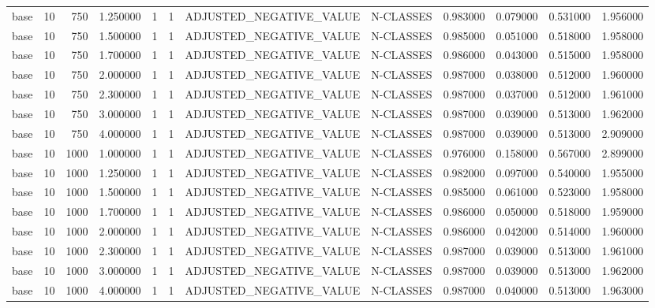 \begin{tabular}{lrrrllllrrrr}
base & 10 & 750 & 1.250000 & 1 & 1 & ADJUSTED_NEGATIVE_VALUE & N-CLASSES & 0.983000 & 0.079000 & 0.531000 & 1.956000 \\
base & 10 & 750 & 1.500000 & 1 & 1 & ADJUSTED_NEGATIVE_VALUE & N-CLASSES & 0.985000 & 0.051000 & 0.518000 & 1.958000 \\
base & 10 & 750 & 1.700000 & 1 & 1 & ADJUSTED_NEGATIVE_VALUE & N-CLASSES & 0.986000 & 0.043000 & 0.515000 & 1.958000 \\
base & 10 & 750 & 2.000000 & 1 & 1 & ADJUSTED_NEGATIVE_VALUE & N-CLASSES & 0.987000 & 0.038000 & 0.512000 & 1.960000 \\
base & 10 & 750 & 2.300000 & 1 & 1 & ADJUSTED_NEGATIVE_VALUE & N-CLASSES & 0.987000 & 0.037000 & 0.512000 & 1.961000 \\
base & 10 & 750 & 3.000000 & 1 & 1 & ADJUSTED_NEGATIVE_VALUE & N-CLASSES & 0.987000 & 0.039000 & 0.513000 & 1.962000 \\
base & 10 & 750 & 4.000000 & 1 & 1 & ADJUSTED_NEGATIVE_VALUE & N-CLASSES & 0.987000 & 0.039000 & 0.513000 & 2.909000 \\
base & 10 & 1000 & 1.000000 & 1 & 1 & ADJUSTED_NEGATIVE_VALUE & N-CLASSES & 0.976000 & 0.158000 & 0.567000 & 2.899000 \\
base & 10 & 1000 & 1.250000 & 1 & 1 & ADJUSTED_NEGATIVE_VALUE & N-CLASSES & 0.982000 & 0.097000 & 0.540000 & 1.955000 \\
base & 10 & 1000 & 1.500000 & 1 & 1 & ADJUSTED_NEGATIVE_VALUE & N-CLASSES & 0.985000 & 0.061000 & 0.523000 & 1.958000 \\
base & 10 & 1000 & 1.700000 & 1 & 1 & ADJUSTED_NEGATIVE_VALUE & N-CLASSES & 0.986000 & 0.050000 & 0.518000 & 1.959000 \\
base & 10 & 1000 & 2.000000 & 1 & 1 & ADJUSTED_NEGATIVE_VALUE & N-CLASSES & 0.986000 & 0.042000 & 0.514000 & 1.960000 \\
base & 10 & 1000 & 2.300000 & 1 & 1 & ADJUSTED_NEGATIVE_VALUE & N-CLASSES & 0.987000 & 0.039000 & 0.513000 & 1.961000 \\
base & 10 & 1000 & 3.000000 & 1 & 1 & ADJUSTED_NEGATIVE_VALUE & N-CLASSES & 0.987000 & 0.039000 & 0.513000 & 1.962000 \\
base & 10 & 1000 & 4.000000 & 1 & 1 & ADJUSTED_NEGATIVE_VALUE & N-CLASSES & 0.987000 & 0.040000 & 0.513000 & 1.963000 \\
\bottomrule
\end{tabular}
